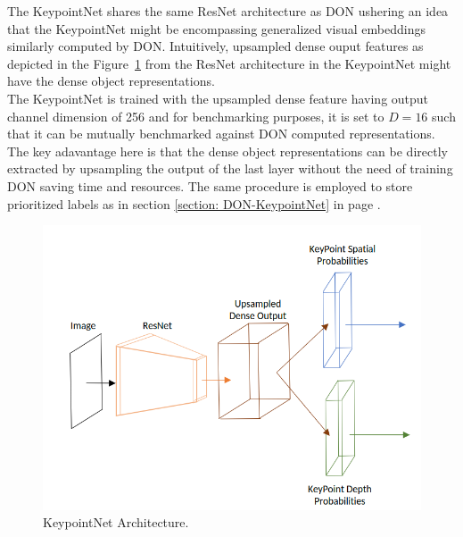 The KeypointNet shares the same \ac{ResNet} architecture as \ac{DON} ushering an idea that the KeypointNet might be encompassing generalized
visual embeddings similarly computed by \ac{DON}.
Intuitively, upsampled dense ouput features as depicted in the Figure~\ref{fig:keynet} from the \ac{ResNet} architecture in the KeypointNet might have the dense object representations.\\

The KeypointNet is trained with the upsampled dense feature having output channel dimension of 256 and for
benchmarking purposes, it is set to $D=16$ such that it can be mutually benchmarked against \ac{DON} computed representations.\\

The key adavantage here is that the dense object representations can be directly extracted by upsampling the output of the last
layer without the need of training \ac{DON} saving time and resources. The same procedure is employed to store prioritized labels as
in section \ref{section: DON-KeypointNet} in page \pageref{section: DON-KeypointNet}.


\begin{figure}[htb]
    \centering
    \caption{KeypointNet Architecture.}
    \label{fig:keynet}
    \includegraphics[scale=0.3]{images/keypointnet/arch.png}
\end{figure}
